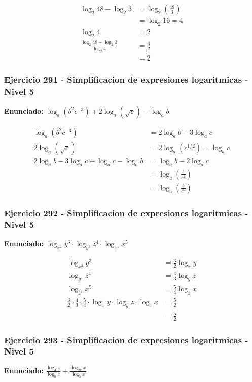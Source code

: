 \documentclass[12pt,a4paper]{article}
\begin{document}
\[
\begin{aligned}
\log_2 48-\log_2 3&=\log_2\left(\frac{48}{3}\right)\\
&=\log_2 16=4\\
\log_2 4&=2\\
\frac{\log_2 48-\log_2 3}{\log_2 4}&=\frac42\\
&=\boxed{2}
\end{aligned}
\]


\subsubsection*{Ejercicio 291 - Simplificacion de expresiones logaritmicas - Nivel 5}
\textbf{Enunciado:} \(\log_a(b^2c^{-3})+2\log_a(\sqrt c)-\log_a b\)

\[
\begin{aligned}
\log_a(b^2c^{-3})&=2\log_a b-3\log_a c\\
2\log_a(\sqrt c)&=2\log_a(c^{1/2})=\log_a c\\
2\log_a b-3\log_a c+\log_a c-\log_a b&=\log_a b-2\log_a c\\
&=\log_a\left(\frac{b}{c^2}\right)\\
&=\boxed{\log_a\left(\frac{b}{c^2}\right)}
\end{aligned}
\]


\subsubsection*{Ejercicio 292 - Simplificacion de expresiones logaritmicas - Nivel 5}
\textbf{Enunciado:} \(\log_{x^2}y^3\cdot\log_{y^3}z^4\cdot\log_{z^4}x^5\)

\[
\begin{aligned}
\log_{x^2}y^3&=\frac32\log_x y\\
\log_{y^3}z^4&=\frac43\log_y z\\
\log_{z^4}x^5&=\frac54\log_z x\\
\frac32\cdot\frac43\cdot\frac54\cdot\log_x y\cdot\log_y z\cdot\log_z x&=\frac52\\
&=\boxed{\frac52}
\end{aligned}
\]


\subsubsection*{Ejercicio 293 - Simplificacion de expresiones logaritmicas - Nivel 5}
\textbf{Enunciado:} \(\frac{\log_3 x}{\log_9 x}+\frac{\log_{27}x}{\log_3 x}\)
\end{document}
